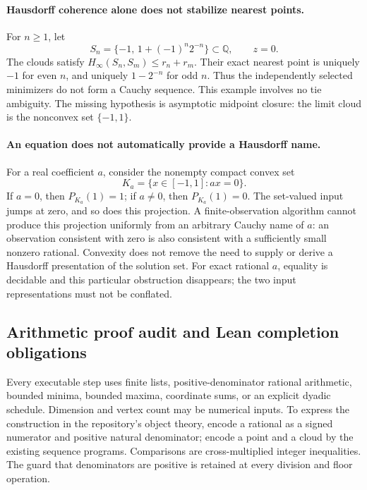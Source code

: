 \paragraph{Hausdorff coherence alone does not stabilize nearest points.}
For \(n\geq1\), let
\[
 S_n=\{-1,\,1+(-1)^n2^{-n}\}\subset\mathbb Q,
 \qquad z=0.
\]
The clouds satisfy \(H_\infty(S_n,S_m)\leq r_n+r_m\).
Their exact nearest point is uniquely \(-1\) for even \(n\), and
uniquely \(1-2^{-n}\) for odd \(n\).  Thus the independently selected
minimizers do not form a Cauchy sequence.  This example involves no tie
ambiguity.  The missing hypothesis is asymptotic midpoint closure: the
limit cloud is the nonconvex set \(\{-1,1\}\).

\paragraph{An equation does not automatically provide a Hausdorff name.}
For a real coefficient \(a\), consider the nonempty compact convex set
\[
 K_a=\{x\in[-1,1]: ax=0\}.
\]
If \(a=0\), then \(P_{K_a}(1)=1\); if \(a\ne0\), then
\(P_{K_a}(1)=0\).  The set-valued input jumps at zero, and so does this
projection.  A finite-observation algorithm cannot produce this projection
uniformly from an arbitrary Cauchy name of \(a\): an observation consistent
with zero is also consistent with a sufficiently small nonzero rational.
Convexity does not remove the need to supply or derive a Hausdorff
presentation of the solution set.  For exact rational \(a\), equality is
decidable and this particular obstruction disappears; the two input
representations must not be conflated.

\subsection{Arithmetic proof audit and Lean completion obligations}

Every executable step uses finite lists, positive-denominator rational
arithmetic, bounded minima, bounded maxima, coordinate sums, or an explicit
dyadic schedule.  Dimension and vertex count may be numerical inputs.
To express the construction in the repository's object theory, encode a
rational as a signed numerator and positive natural denominator; encode a
point and a cloud by the existing sequence programs.  Comparisons are
cross-multiplied integer inequalities.  The guard that denominators are
positive is retained at every division and floor operation.

